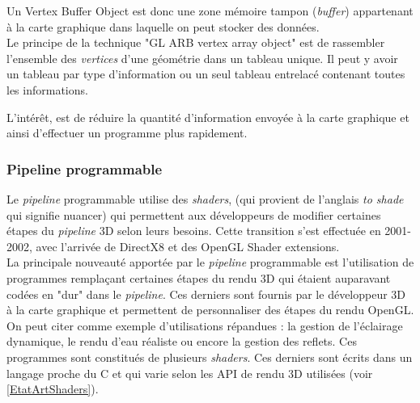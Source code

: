 \documentclass[11pt]{report}
\begin{document}
Un Vertex Buffer Object est donc une zone mémoire tampon (\textit{buffer}) appartenant à la carte graphique dans laquelle on peut stocker des données.\\

	Le principe de la technique "GL ARB vertex array object" est de rassembler l'ensemble des \textit{vertices} d'une géométrie dans un tableau unique. Il peut y avoir un tableau par type d'information ou un seul tableau entrelacé contenant toutes les informations.

L'intérêt, est de réduire la quantité d'information envoyée à la carte graphique et ainsi d'effectuer un programme plus rapidement. \cite{vbo}

\subsubsection{Pipeline programmable} %




Le \textit{pipeline} programmable utilise des \textit{shaders}, (qui provient de l'anglais \textit{to shade} qui signifie nuancer) qui permettent aux développeurs de modifier certaines étapes du \textit{pipeline} 3D selon leurs besoins. Cette transition s'est effectuée en 2001-2002, avec l'arrivée de DirectX8 et des OpenGL Shader extensions.
\\ 

La principale nouveauté apportée par le \textit{pipeline} programmable est l'utilisation de programmes remplaçant certaines étapes du rendu 3D qui étaient auparavant codées en "dur" dans le \textit{pipeline}. Ces derniers sont fournis par le développeur 3D à la carte graphique et permettent de personnaliser des étapes du rendu OpenGL. On peut citer comme exemple d'utilisations répandues : la gestion de l'éclairage dynamique, le rendu d'eau réaliste ou encore la gestion des reflets. Ces programmes sont constitués de plusieurs \textit{shaders}. Ces derniers sont écrits dans un langage proche du C et qui varie selon les API de rendu 3D utilisées (voir \ref{EtatArtShaders}). \\


\end{document}
